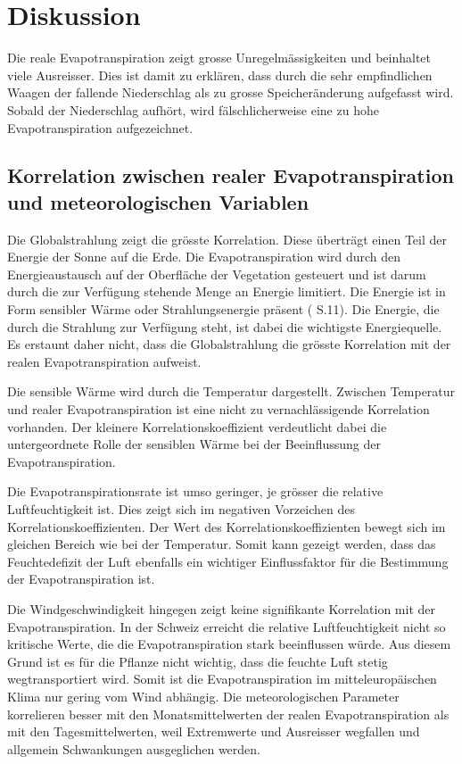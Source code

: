 \section{Diskussion}
Die reale Evapotranspiration zeigt grosse Unregelmässigkeiten und beinhaltet viele Ausreisser. Dies ist damit zu erklären, dass durch die sehr empfindlichen Waagen der fallende Niederschlag als zu grosse Speicheränderung aufgefasst wird. Sobald der Niederschlag aufhört, wird fälschlicherweise eine zu hohe Evapotranspiration aufgezeichnet.

\subsection{Korrelation zwischen realer Evapotranspiration und meteorologischen Variablen}
Die Globalstrahlung zeigt die grösste Korrelation. Diese überträgt einen Teil der Energie der Sonne auf die Erde. Die Evapotranspiration wird durch den Energieaustausch auf der Oberfläche der Vegetation gesteuert und ist darum durch die zur Verfügung stehende Menge an Energie limitiert. Die Energie ist in Form sensibler Wärme oder Strahlungsenergie präsent (\cite{fao} S.11). Die Energie, die durch die Strahlung zur Verfügung steht, ist dabei die wichtigste Energiequelle. Es erstaunt daher nicht, dass die Globalstrahlung die grösste Korrelation mit der realen Evapotranspiration aufweist.

Die sensible Wärme wird durch die Temperatur dargestellt. Zwischen Temperatur und realer Evapotranspiration ist eine nicht zu vernachlässigende Korrelation vorhanden. Der kleinere Korrelationskoeffizient verdeutlicht dabei die untergeordnete Rolle der sensiblen Wärme bei der Beeinflussung der Evapotranspiration.

Die Evapotranspirationsrate ist umso geringer, je grösser die relative Luftfeuchtigkeit ist. Dies zeigt sich im negativen Vorzeichen des Korrelationskoeffizienten. Der Wert des Korrelationskoeffizienten bewegt sich im gleichen Bereich wie bei der Temperatur. Somit kann gezeigt werden, dass das Feuchtedefizit der Luft ebenfalls ein wichtiger Einflussfaktor für die Bestimmung der Evapotranspiration ist.

Die Windgeschwindigkeit hingegen zeigt keine signifikante Korrelation mit der Evapotranspiration. In der Schweiz erreicht die relative Luftfeuchtigkeit nicht so kritische Werte, die die Evapotranspiration stark beeinflussen würde. Aus diesem Grund ist es für die Pflanze nicht wichtig, dass die feuchte Luft stetig wegtransportiert wird. Somit ist die Evapotranspiration im mitteleuropäischen Klima nur gering vom Wind abhängig.
Die meteorologischen Parameter korrelieren besser mit den Monatsmittelwerten der realen Evapotranspiration als mit den Tagesmittelwerten, weil Extremwerte und Ausreisser wegfallen und allgemein Schwankungen ausgeglichen werden. 

